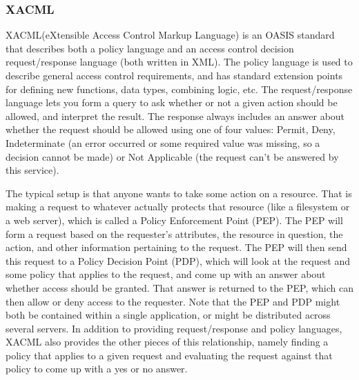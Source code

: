 \subsubsection{XACML}XACML(eXtensible Access Control Markup Language) is an OASIS standard that describes both a policy language and an access control decision request/response language (both written in XML). The policy language is used to describe general access control requirements, and has standard extension points for defining new functions, data types, combining logic, etc. The request/response language lets you form a query to ask whether or not a given action should be allowed, and interpret the result. The response always includes an answer about whether the request should be allowed using one of four values: Permit, Deny, Indeterminate (an error occurred or some required value was missing, so a decision cannot be made) or Not Applicable (the request can't be answered by this service). 
\par 
The typical setup is that anyone wants to take some action on a resource. That is making a request to whatever actually protects that resource (like a filesystem or a web server), which is called a Policy Enforcement Point (PEP). The PEP will form a request based on the requester's attributes, the resource in question, the action, and other information pertaining to the request. The PEP will then send this request to a Policy Decision Point (PDP), which will look at the request and some policy that applies to the request, and come up with an answer about whether access should be granted. That answer is returned to the PEP, which can then allow or deny access to the requester. Note that the PEP and PDP might both be contained within a single application, or might be distributed across several servers. In addition to providing request/response and policy languages, XACML also provides the other pieces of this relationship, namely finding a policy that applies to a given request and evaluating the request against that policy to come up with a yes or no answer. 

